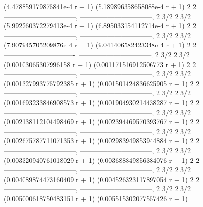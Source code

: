 \documentclass[a4paper,10pt]{article}
\begin{document}
\begin{eulernotebook}
\begin{euleroutput}
  (4.478859179875841e-4 r  + 1)     (5.189896358658088e-4 r  + 1)
                 2                                 2
  --------------------------------, --------------------------------, 
                         2     3/2                         2     3/2
  (5.992260372279413e-4 r  + 1)     (6.895033154112714e-4 r  + 1)
                 2                                 2
  --------------------------------, --------------------------------, 
                         2     3/2                         2     3/2
  (7.907945705209876e-4 r  + 1)     (9.041406582423348e-4 r  + 1)
                 2                                2
  -------------------------------, --------------------------------, 
                        2     3/2                         2     3/2
  (0.00103065307996158 r  + 1)     (0.001171516912506773 r  + 1)
                 2                                 2
  --------------------------------, --------------------------------, 
                         2     3/2                         2     3/2
  (0.001327993775792385 r  + 1)     (0.001501424836625905 r  + 1)
                 2                                 2
  --------------------------------, --------------------------------, 
                         2     3/2                         2     3/2
  (0.001693233846908573 r  + 1)     (0.001904930214438287 r  + 1)
                 2                                 2
  --------------------------------, --------------------------------, 
                         2     3/2                         2     3/2
  (0.002138112104498469 r  + 1)     (0.002394469570393767 r  + 1)
                 2                                 2
  --------------------------------, --------------------------------, 
                         2     3/2                         2     3/2
  (0.002675787711071353 r  + 1)     (0.002983949853944884 r  + 1)
                 2                                 2
  --------------------------------, --------------------------------, 
                         2     3/2                         2     3/2
  (0.003320940761018029 r  + 1)     (0.003688849856384076 r  + 1)
                 2                                 2
  --------------------------------, --------------------------------, 
                         2     3/2                         2     3/2
  (0.004089874473160409 r  + 1)     (0.004526323117897054 r  + 1)
                 2                                 2
  --------------------------------, --------------------------------, 
                         2     3/2                         2     3/2
  (0.005000618750483151 r  + 1)     (0.005515302077557426 r  + 1)

\end{euleroutput}
\end{eulernotebook}
\end{document}
